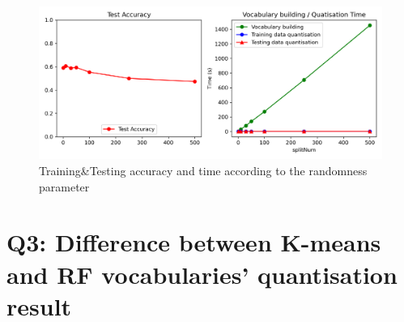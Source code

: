 \begin{figure}[htbp]
	\centering
	\includegraphics[width=0.5\linewidth]{image/q3-fig5.png}
	\caption{Training\&Testing accuracy and time according to the randomness parameter}
	\label{fig:q3-fig5}
\end{figure}

\section{Q3: Difference between K-means and RF vocabularies' quantisation result}


